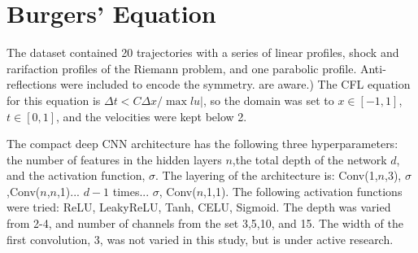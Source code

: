 \documentclass{article}
\begin{document}
\section{Burgers' Equation}

The dataset contained 20 trajectories with a series of linear profiles, shock and rarifaction
profiles of the Riemann problem, and one parabolic
profile. Anti-reflections were included to encode the symmetry.
are aware.)
The CFL equation for this equation is $\Delta t < C \Delta
x / \max lu|$, so the domain was set to $x\in[-1,1]$, $t\in[0,1]$, and
the velocities were kept below 2.


The compact deep CNN architecture has the following three hyperparameters: the number of
features in the hidden layers $n$,the total depth of the network $d$,
and the activation function, $\sigma$. The layering of the
architecture is: 
Conv(1,$n$,3), $\sigma$,Conv($n$,$n$,1)... $d-1$ times... $\sigma$,
Conv($n$,1,1).
The following activation functions were tried: ReLU, LeakyReLU, Tanh,
CELU, Sigmoid. The depth was varied from 2-4, and number of channels
from the set 3,5,10, and 15.
The width of the first convolution, 3, was not varied in this study,
but is under active research.
\end{document}
